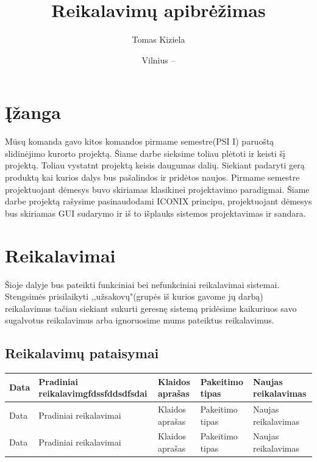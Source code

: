 \documentclass[oneside]{VUMIFPSkursinis}
\title{Reikalavimų apibrėžimas}
\author{Tomas Kiziela}
\date{Vilnius – \the\year}
\begin{document}
\maketitle
\tableofcontents

\section{Įžanga}
Mūsų komanda gavo kitos komandos pirmame semestre(PSI I) paruoštą slidinėjimo kurorto projektą. Šiame darbe sieksime toliau plėtoti ir keisti šį projektą. Toliau vystatnt projektą keisis daugumas dalių. Siekiant padaryti gerą produktą kai kurios  dalys bus pašalindos ir pridėtos naujos. Pirmame semestre projektuojant dėmesys buvo skiriamas klasikinei projektavimo paradigmai. Šiame darbe projektą rašysime pasinaudodami ICONIX principu, projektuojant dėmesys bus skiriamas GUI sudarymo ir iš to išplauks sistemos projektavimas ir sandara. 

\section{Reikalavimai}
Šioje dalyje bus pateikti funkciniai bei nefunkciniai reikalavimai sistemai. Stengsimės prisilaikyti ,,užsakovų"(grupės iš kurios gavome jų darbą) reikalavimus tačiau siekiant sukurti geresnę sistemą pridėsime kaikuriuos savo sugalvotus reikalavimus arba ignoruosime mums pateiktus reikalavimus. 

\subsection{Reikalavimų pataisymai}
\begin{table}[htbp]

\begin{tabularx}{1\textwidth}{  |P{1cm}|X|P{2cm}|p{2cm}|X| }  \hline
	Data & Pradiniai reikalavimgfdssfddsdfsdai & Klaidos aprašas & Pakeitimo tipas & Naujas reikalavimas \\ \hline
Data & Pradiniai reikalavimai & Klaidos aprašas & Pakeitimo tipas & Naujas reikalavimas \\ \hline
Data & Pradiniai reikalavimai & Klaidos aprašas & Pakeitimo tipas & Naujas reikalavimas \\ \hline

	
	

\end{tabularx}

	
\end{table}
\end{document}

